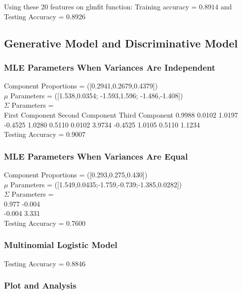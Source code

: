 \documentclass[letter,11pt]{article}
\begin{document}
	Using these 20 features on glmfit function: 
	Training accuracy = $0.8914$ and Testing Accuracy = $0.8926$
	
	\subsection{Generative Model and Discriminative Model}
	\subsubsection{MLE Parameters When Variances Are Independent}
	
	Component Proportions = ([0.2941,0.2679,0.4379])\\
	$\mu$ Parameters = ([1.538,0.0354; -1.593,1.596; -1.486,-1.408])\\
	$\Sigma$ Parameters  =\\
	First Component \hspace{15mm} Second Component \hspace{15mm} Third Component
	0.9988    0.0102 \hspace{25mm}  1.0197   -0.4525 \hspace{25mm}      1.0280    0.5110
    0.0102    3.9734  \hspace{25mm} -0.4525    1.0105 \hspace{24mm}      0.5110    1.1234\\
    Testing Accuracy = 0.9007
    
    \subsubsection{MLE Parameters When Variances Are Equal}
	Component Proportions = ([0.293,0.275,0.430])\\
	$\mu$ Parameters = ([1.549,0.0435;-1.759,-0.739;-1.385,0.0282])\\
	$\Sigma$ Parameters  =\\
	0.977 -0.004\\
	 -0.004 3.331\\
	Testing Accuracy = 0.7600
	
	\subsubsection{Multinomial Logistic Model}
	Testing Accuracy = 0.8846
	
	\subsubsection{Plot and Analysis}	
		 
\end{document}
